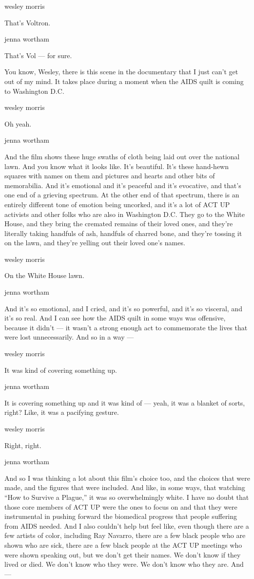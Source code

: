 wesley morris

That's Voltron.

jenna wortham

That's Vol --- for sure.

You know, Wesley, there is this scene in the documentary that I just
can't get out of my mind. It takes place during a moment when the AIDS
quilt is coming to Washington D.C.

wesley morris

Oh yeah.

jenna wortham

And the film shows these huge swaths of cloth being laid out over the
national lawn. And you know what it looks like. It's beautiful. It's
these hand-hewn squares with names on them and pictures and hearts and
other bits of memorabilia. And it's emotional and it's peaceful and it's
evocative, and that's one end of a grieving spectrum. At the other end
of that spectrum, there is an entirely different tone of emotion being
uncorked, and it's a lot of ACT UP activists and other folks who are
also in Washington D.C. They go to the White House, and they bring the
cremated remains of their loved ones, and they're literally taking
handfuls of ash, handfuls of charred bone, and they're tossing it on the
lawn, and they're yelling out their loved one's names.

wesley morris

On the White House lawn.

jenna wortham

And it's so emotional, and I cried, and it's so powerful, and it's so
visceral, and it's so real. And I can see how the AIDS quilt in some
ways was offensive, because it didn't --- it wasn't a strong enough act
to commemorate the lives that were lost unnecessarily. And so in a way
---

wesley morris

It was kind of covering something up.

jenna wortham

It is covering something up and it was kind of --- yeah, it was a
blanket of sorts, right? Like, it was a pacifying gesture.

wesley morris

Right, right.

jenna wortham

And so I was thinking a lot about this film's choice too, and the
choices that were made, and the figures that were included. And like, in
some ways, that watching ``How to Survive a Plague,'' it was so
overwhelmingly white. I have no doubt that those core members of ACT UP
were the ones to focus on and that they were instrumental in pushing
forward the biomedical progress that people suffering from AIDS needed.
And I also couldn't help but feel like, even though there are a few
artists of color, including Ray Navarro, there are a few black people
who are shown who are sick, there are a few black people at the ACT UP
meetings who were shown speaking out, but we don't get their names. We
don't know if they lived or died. We don't know who they were. We don't
know who they are. And ---

